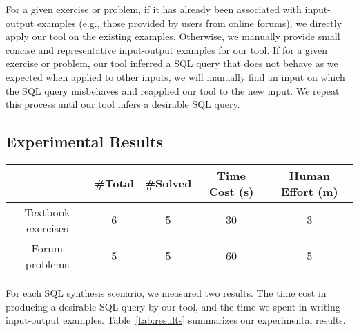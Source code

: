 
For a given exercise or problem, if it
has already been associated with input-output examples (e.g.,
those provided by users from online forums),
we directly apply our tool on the existing examples.
Otherwise, we manually provide small concise and representative
input-output examples for our tool.
If for a given exercise or problem, our tool inferred
a SQL query that does not behave as we expected when applied
to other inputs, we will manually find an input on which the
SQL query misbehaves and reapplied our tool to the new input. We
repeat this process until our tool infers a desirable SQL query.

\subsection{Experimental Results}

\begin{table}[t]
\setlength{\tabcolsep}{.14\tabcolsep}
\begin{tabular}{|c|c|c|c|c|}
\hline
 & \#Total& \#Solved& Time Cost (s) & Human Effort (m)\\
 \hline
 Textbook exercises &  6 &  5 &  30 & 3 \\
\hline
 Forum problems &  5 &  5  &  60 & 5\\
\hline
\end{tabular}

\end{table}

For each SQL synthesis scenario, we measured two results.
The time cost in producing
a desirable SQL query by our tool, and
the time we spent in writing input-output examples.
Table~\ref{tab:results} summarizes our experimental results.

